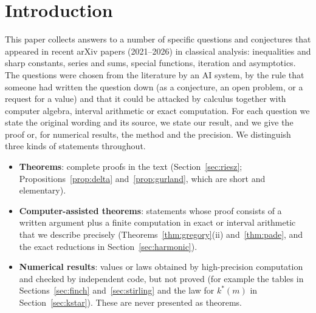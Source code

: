 \section{Introduction}\label{sec:intro}

This paper collects answers to a number of specific questions and conjectures that appeared in recent arXiv papers (2021--2026) in classical analysis: inequalities and sharp constants, series and sums, special functions, iteration and asymptotics. The questions were chosen from the literature by an AI system, by the rule that someone had written the question down (as a conjecture, an open problem, or a request for a value) and that it could be attacked by calculus together with computer algebra, interval arithmetic or exact computation. For each question we state the original wording and its source, we state our result, and we give the proof or, for numerical results, the method and the precision. We distinguish three kinds of statements throughout.

\begin{itemize}[leftmargin=2em]
\item \textbf{Theorems}: complete proofs in the text (Section~\ref{sec:riesz}; Propositions~\ref{prop:delta} and~\ref{prop:gurland}, which are short and elementary).
\item \textbf{Computer-assisted theorems}: statements whose proof consists of a written argument plus a finite computation in exact or interval arithmetic that we describe precisely (Theorems~\ref{thm:gregory}(ii) and~\ref{thm:pade}, and the exact reductions in Section~\ref{sec:harmonic}).
\item \textbf{Numerical results}: values or laws obtained by high-precision computation and checked by independent code, but not proved (for example the tables in Sections~\ref{sec:finch} and~\ref{sec:stirling} and the law for $k^*(m)$ in Section~\ref{sec:kstar}). These are never presented as theorems.
\end{itemize}

